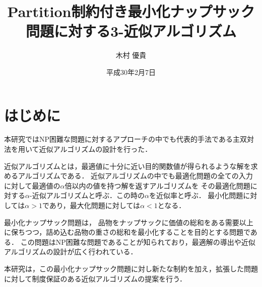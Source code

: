 \documentclass[twocolumn,10pt,dvipdfmx]{jarticle}
\date{平成30年2月7日}
\title{\Large Partition制約付き最小化ナップサック問題に対する3-近似アルゴリズム}
\author{木村 優貴}
\numberwithin{equation}{section}
\begin{document}
\maketitle
\section{はじめに}
	本研究ではNP困難な問題に対するアプローチの中でも代表的手法である主双対法を用いて近似アルゴリズムの設計を行った．\par
	近似アルゴリズムとは，最適値に十分に近い目的関数値が得られるような解を求めるアルゴリズムである．
	近似アルゴリズムの中でも最適化問題の全ての入力に対して最適値の$\alpha$倍以内の値を持つ解を返すアルゴリズムを
	その最適化問題に対する$\alpha$-近似アルゴリズムと呼ぶ\cite{apx_des,apx_al}．この時の$\alpha$を近似率と呼ぶ．
	最小化問題に対しては$\alpha>1$であり，最大化問題に対しては$\alpha<1$となる．\par
	最小化ナップサック問題は，
	品物をナップサックに価値の総和をある需要以上に保ちつつ，詰め込む品物の重さの総和を最小化することを目的とする問題である\cite{apx_des}．
	この問題はNP困難な問題であることが知られており\cite{np_c}，最適解の導出や近似アルゴリズムの設計が広く行われている．\par
	本研究は，この最小化ナップサック問題に対し新たな制約を加え，拡張した問題に対して制度保証のある近似アルゴリズムの提案を行う．
\end{document}
